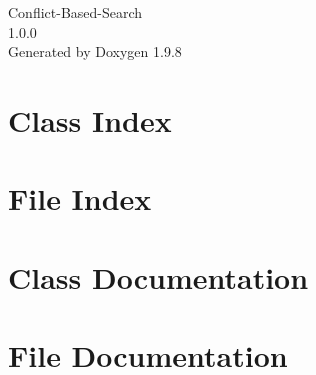 \documentclass[twoside]{book}
\newcommand{\+}{\discretionary{\mbox{\scriptsize$\hookleftarrow$}}{}{}}
\newcommand{\clearemptydoublepage}{%
    \newpage{\pagestyle{empty}\cleardoublepage}%
  }
\begin{document}
  \raggedbottom
    \hypersetup{pageanchor=false,
                bookmarksnumbered=true,
                pdfencoding=unicode
               }
  \begin{titlepage}
  \vspace*{7cm}
  \begin{center}%
  {\Large Conflict-\/\+Based-\/\+Search}\\
  [1ex]\large 1.\+0.\+0 \\
  \vspace*{1cm}
  {\large Generated by Doxygen 1.9.8}\\
  \end{center}
  \end{titlepage}
  \clearemptydoublepage
  \tableofcontents
  \clearemptydoublepage
  \hypersetup{pageanchor=true}

\chapter{Class Index}

\chapter{File Index}

\chapter{Class Documentation}










\chapter{File Documentation}




  \backmatter
  \newpage
  \clearemptydoublepage
  \printindex
\end{document}
